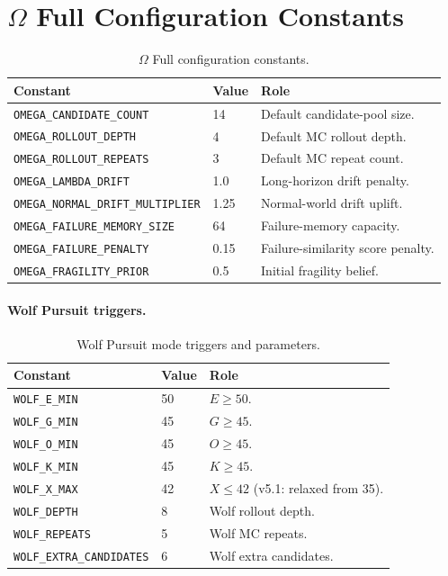 \section{$\Omega$ Full Configuration Constants}
\label{sec:world-omega-config}

\begin{table}[ht]
\centering
\small
\begin{tabularx}{\linewidth}{Xll}
\toprule
\textbf{Constant} & \textbf{Value} & \textbf{Role} \\
\midrule
\texttt{OMEGA\_CANDIDATE\_COUNT} & 14 & Default candidate-pool
size. \\
\texttt{OMEGA\_ROLLOUT\_DEPTH} & 4 & Default MC rollout depth. \\
\texttt{OMEGA\_ROLLOUT\_REPEATS} & 3 & Default MC repeat count. \\
\texttt{OMEGA\_LAMBDA\_DRIFT} & 1.0 & Long-horizon drift penalty. \\
\texttt{OMEGA\_NORMAL\_DRIFT\_MULTIPLIER} & 1.25 & Normal-world
drift uplift. \\
\texttt{OMEGA\_FAILURE\_MEMORY\_SIZE} & 64 & Failure-memory
capacity. \\
\texttt{OMEGA\_FAILURE\_PENALTY} & 0.15 & Failure-similarity score
penalty. \\
\texttt{OMEGA\_FRAGILITY\_PRIOR} & 0.5 & Initial fragility belief. \\
\bottomrule
\end{tabularx}
\caption[Omega Full constants]{$\Omega$ Full configuration
constants.}
\label{tab:omega-constants}
\end{table}

\paragraph{Wolf Pursuit triggers.}

\begin{table}[ht]
\centering
\small
\begin{tabularx}{\linewidth}{Xll}
\toprule
\textbf{Constant} & \textbf{Value} & \textbf{Role} \\
\midrule
\texttt{WOLF\_E\_MIN} & 50 & $E \ge 50$. \\
\texttt{WOLF\_G\_MIN} & 45 & $G \ge 45$. \\
\texttt{WOLF\_O\_MIN} & 45 & $O \ge 45$. \\
\texttt{WOLF\_K\_MIN} & 45 & $K \ge 45$. \\
\texttt{WOLF\_X\_MAX} & 42 & $X \le 42$ (v5.1: relaxed from 35). \\
\texttt{WOLF\_DEPTH} & 8 & Wolf rollout depth. \\
\texttt{WOLF\_REPEATS} & 5 & Wolf MC repeats. \\
\texttt{WOLF\_EXTRA\_CANDIDATES} & 6 & Wolf extra candidates. \\
\bottomrule
\end{tabularx}
\caption[Wolf Pursuit triggers]{Wolf Pursuit mode triggers and
parameters.}
\label{tab:wolf-triggers}
\end{table}

